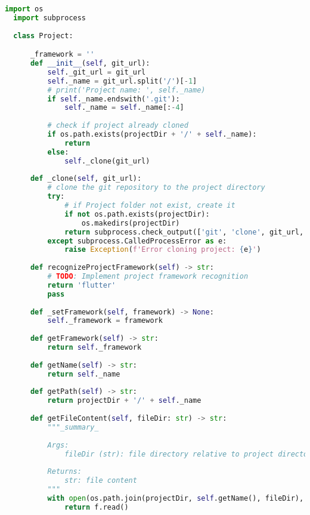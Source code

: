 \begin{lstlisting}[language=Python, caption={$\texttt{Project}$ class.}, label={lst:1}]
  import os
  import subprocess
  
  class Project:

      _framework = ''
      def __init__(self, git_url):
          self._git_url = git_url
          self._name = git_url.split('/')[-1]
          # print('Project name: ', self._name)
          if self._name.endswith('.git'):
              self._name = self._name[:-4]
          
          # check if project already cloned
          if os.path.exists(projectDir + '/' + self._name):
              return
          else:
              self._clone(git_url)
      
      def _clone(self, git_url):
          # clone the git repository to the project directory
          try:
              # if Project folder not exist, create it
              if not os.path.exists(projectDir):
                  os.makedirs(projectDir)
              return subprocess.check_output(['git', 'clone', git_url, projectDir + '/' + self._name], universal_newlines=True)
          except subprocess.CalledProcessError as e:
              raise Exception(f'Error cloning project: {e}')
      
      def recognizeProjectFramework(self) -> str:
          # TODO: Implement project framework recognition
          return 'flutter'
          pass
      
      def _setFramework(self, framework) -> None:
          self._framework = framework
          
      def getFramework(self) -> str:
          return self._framework
          
      def getName(self) -> str:
          return self._name
          
      def getPath(self) -> str:
          return projectDir + '/' + self._name
          
      def getFileContent(self, fileDir: str) -> str:
          """_summary_
  
          Args:
              fileDir (str): file directory relative to project directory
  
          Returns:
              str: file content
          """
          with open(os.path.join(projectDir, self.getName(), fileDir), 'r') as f:
              return f.read()
\end{lstlisting}


